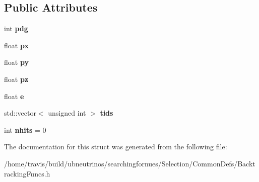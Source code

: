 \subsection*{Public Attributes}
\begin{DoxyCompactItemize}
\item 
\hypertarget{structsearchingfornues_1_1BtPart_a4adfa8d6e2aab316bfda7d64d6cecb3e}{int {\bfseries pdg}}\label{structsearchingfornues_1_1BtPart_a4adfa8d6e2aab316bfda7d64d6cecb3e}

\item 
\hypertarget{structsearchingfornues_1_1BtPart_a3a0ddc2493391fd58b384792e0a1a5fd}{float {\bfseries px}}\label{structsearchingfornues_1_1BtPart_a3a0ddc2493391fd58b384792e0a1a5fd}

\item 
\hypertarget{structsearchingfornues_1_1BtPart_a7862a99921a6cdc435f401c4a7c70668}{float {\bfseries py}}\label{structsearchingfornues_1_1BtPart_a7862a99921a6cdc435f401c4a7c70668}

\item 
\hypertarget{structsearchingfornues_1_1BtPart_ad65a32274c4b8b61a78739ed76080f3b}{float {\bfseries pz}}\label{structsearchingfornues_1_1BtPart_ad65a32274c4b8b61a78739ed76080f3b}

\item 
\hypertarget{structsearchingfornues_1_1BtPart_a0037317972c950fac8188464838a9645}{float {\bfseries e}}\label{structsearchingfornues_1_1BtPart_a0037317972c950fac8188464838a9645}

\item 
\hypertarget{structsearchingfornues_1_1BtPart_a0584d6c3edff2a6483d1fa94fd2d7a8c}{std\-::vector$<$ unsigned int $>$ {\bfseries tids}}\label{structsearchingfornues_1_1BtPart_a0584d6c3edff2a6483d1fa94fd2d7a8c}

\item 
\hypertarget{structsearchingfornues_1_1BtPart_a053f98b42289602fdeb9ca36e63fe0ee}{int {\bfseries nhits} = 0}\label{structsearchingfornues_1_1BtPart_a053f98b42289602fdeb9ca36e63fe0ee}

\end{DoxyCompactItemize}


The documentation for this struct was generated from the following file\-:\begin{DoxyCompactItemize}
\item 
/home/travis/build/ubneutrinos/searchingfornues/\-Selection/\-Common\-Defs/Backtracking\-Funcs.\-h\end{DoxyCompactItemize}

